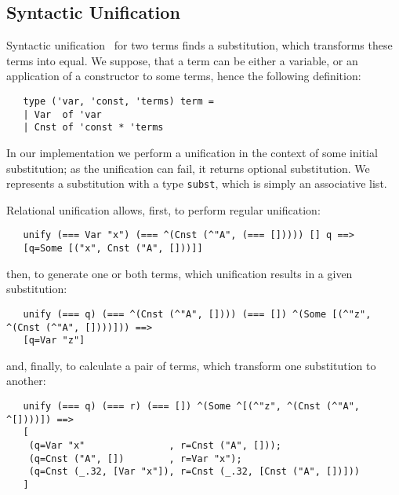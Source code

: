 \subsection{Syntactic Unification}

Syntactic unification~\cite{Unification} for two terms finds a substitution, which transforms these terms into equal. We 
suppose, that a term can be either a variable, or an application of a constructor to some terms, hence the following definition:

\begin{lstlisting}
   type ('var, 'const, 'terms) term = 
   | Var  of 'var
   | Cnst of 'const * 'terms
\end{lstlisting}

In our implementation we perform a unification in the context of some initial substitution; as the unification can fail, it
returns optional substitution. We represents a substitution with a type \lstinline|subst|, which is simply an associative
list. 

Relational unification allows, first, to perform regular unification:

\begin{lstlisting}
   unify (=== Var "x") (=== ^(Cnst (^"A", (=== [])))) [] q ==> 
   [q=Some [("x", Cnst ("A", []))]]
\end{lstlisting}

then, to generate one or both terms, which unification results in a given substitution:

\begin{lstlisting}
   unify (=== q) (=== ^(Cnst (^"A", []))) (=== []) ^(Some [(^"z", ^(Cnst (^"A", [])))])) ==> 
   [q=Var "z"]
\end{lstlisting}

and, finally, to calculate a pair of terms, which transform one substitution to another:

\begin{lstlisting}
   unify (=== q) (=== r) (=== []) ^(Some ^[(^"z", ^(Cnst (^"A", ^[])))]) ==> 
   [
    (q=Var "x"               , r=Cnst ("A", []));
    (q=Cnst ("A", [])        , r=Var "x");
    (q=Cnst (_.32, [Var "x"]), r=Cnst (_.32, [Cnst ("A", [])]))
   ]
\end{lstlisting}

